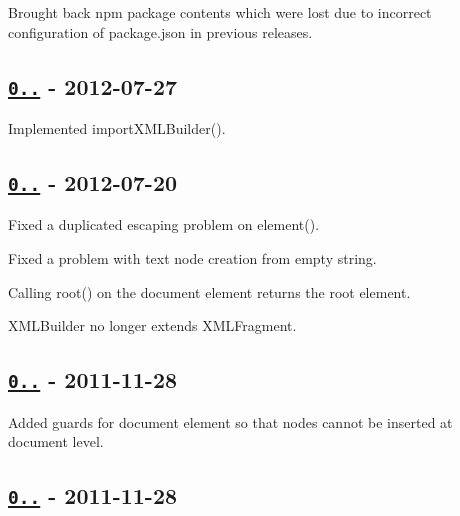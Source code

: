 \begin{DoxyItemize}
\item Brought back npm package contents which were lost due to incorrect configuration of {\ttfamily package.\+json} in previous releases.
\end{DoxyItemize}

\subsection*{\href{https://github.com/oozcitak/xmlbuilder-js/compare/v0.3.2...v0.3.3}{\tt 0..} -\/ 2012-\/07-\/27}


\begin{DoxyItemize}
\item Implemented {\ttfamily import\+X\+M\+L\+Builder()}.
\end{DoxyItemize}

\subsection*{\href{https://github.com/oozcitak/xmlbuilder-js/compare/v0.3.1...v0.3.2}{\tt 0..} -\/ 2012-\/07-\/20}


\begin{DoxyItemize}
\item Fixed a duplicated escaping problem on {\ttfamily element()}.
\item Fixed a problem with text node creation from empty string.
\item Calling {\ttfamily root()} on the document element returns the root element.
\item {\ttfamily X\+M\+L\+Builder} no longer extends {\ttfamily X\+M\+L\+Fragment}.
\end{DoxyItemize}

\subsection*{\href{https://github.com/oozcitak/xmlbuilder-js/compare/v0.3.0...v0.3.1}{\tt 0..} -\/ 2011-\/11-\/28}


\begin{DoxyItemize}
\item Added guards for document element so that nodes cannot be inserted at document level.
\end{DoxyItemize}

\subsection*{\href{https://github.com/oozcitak/xmlbuilder-js/compare/v0.2.2...v0.3.0}{\tt 0..} -\/ 2011-\/11-\/28}


